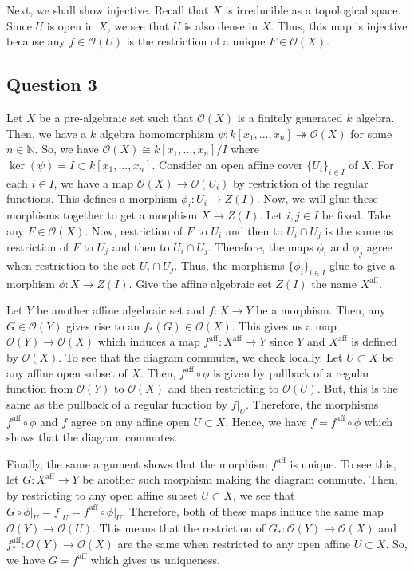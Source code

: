\documentclass{article}
\newcommand{\N}{\mathbb{N}}
\newcommand{\OO}{\mathcal{O}}
\begin{document}
Next, we shall show injective. Recall that $X$ is irreducible as a topological space. 
Since $U$ is open in $X$, we see that $U$ is also dense in $X$. Thus, this map is injective because any 
$f\in \mathcal{O}(U)$ is the restriction of a unique $F\in \mathcal{O}(X)$. 

\subsection*{Question 3}
Let $X$ be a pre-algebraic set such that $\OO(X)$ is a finitely generated $k$ algebra. 
Then, we have a $k$ algebra homomorphism $\psi: k[x_1,\dots,x_n] \twoheadrightarrow \OO(X)$ for some $n\in\N$.  
So, we have $\OO(X) \cong k[x_1,\dots,x_n] / I$ where $\ker(\psi) = I \subset k[x_1,\dots,x_n]$. 
Consider an open affine cover $\{U_i\}_{i\in I}$ of $X$. 
For each $i\in I$, we have a map $\OO(X) \to \OO(U_i)$ by restriction of the regular functions. 
This defines a morphism $\phi_i: U_i \to Z(I)$. 
Now, we will glue these morphisms together to get a morphism $X \to Z(I)$. 
Let $i,j\in I$ be fixed. Take any $F\in \OO(X)$. Now, restriction of $F$ to $U_i$ 
and then to $U_i \cap U_j$ is the same as restriction of $F$ to $U_j$ and then to 
$U_i \cap U_j$. Therefore, the maps $\phi_i$ and $\phi_j$ agree when restriction to 
the set $U_i \cap U_j$. Thus, the morphisms $\{\phi_i\}_{i\in I}$ glue to give a morphism 
$\phi: X \to Z(I)$. Give the affine algebraic set $Z(I)$ the name $X^{\textrm{aff}}$. 

Let $Y$ be another affine algebraic set and $f: X \to Y$ be a morphism. 
Then, any $G \in \OO(Y)$ gives rise to an $f_*(G) \in \OO(X)$. This gives us a map 
$\OO(Y) \to \OO(X)$ which induces a map $f^{\textrm{aff}}: X^{\textrm{aff}} \to Y$ 
since $Y$ and $X^{\textrm{aff}}$ is defined by $\OO(X)$. To see that the diagram 
commutes, we check locally. Let $U \subset X$ be any affine open subset of $X$. 
Then, $f^{\textrm{aff}} \circ \phi$ is given by pullback of a regular function from $\OO(Y)$ to $\OO(X)$ 
and then restricting to $\OO(U)$. But, this is the same as the pullback of a regular function by $f\big|_{U}$. 
Therefore, the morphisms $f^{\textrm{aff}} \circ \phi$ and $f$ agree on any affine open $U \subset X$. 
Hence, we have $f = f^{\textrm{aff}} \circ \phi$ which shows that the diagram commutes. 

Finally, the same argument shows that the morphism $f^{\textrm{aff}}$ is unique. 
To see this, let $G: X^{\textrm{aff}} \to Y$ be another such morphism making the diagram commute. 
Then, by restricting to any open affine subset $U\subset X$, we see that 
$G \circ \phi \big|_U = f \big|_U = f^{\textrm{aff}} \circ \phi \big|_U$. 
Therefore, both of these maps induce the same map $\OO(Y) \to \OO(U)$. This means that 
the restriction of $G_*: \OO(Y) \to \OO(X)$ and $f^{\textrm{aff}}_*: \OO(Y) \to \OO(X)$ 
are the same when restricted to any open affine $U\subset X$. So, we have $G=f^{\textrm{aff}}$ which 
gives us uniqueness. 
\end{document}
